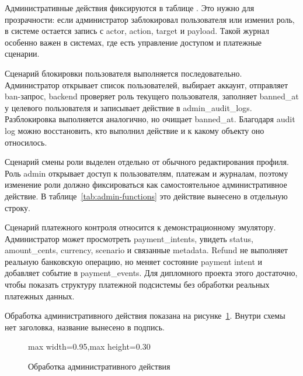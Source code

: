 Административные действия фиксируются в таблице . Это нужно для прозрачности: если администратор заблокировал пользователя или изменил роль, в системе остается запись с actor, action, target и payload. Такой журнал особенно важен в системах, где есть управление доступом и платежные сценарии.




Сценарий блокировки пользователя выполняется последовательно. Администратор открывает список пользователей, выбирает аккаунт, отправляет ban-запрос, backend проверяет роль текущего пользователя, заполняет banned_at у целевого пользователя и записывает действие в admin_audit_logs. Разблокировка выполняется аналогично, но очищает banned_at. Благодаря audit log можно восстановить, кто выполнил действие и к какому объекту оно относилось.

Сценарий смены роли выделен отдельно от обычного редактирования профиля. Роль admin открывает доступ к пользователям, платежам и журналам, поэтому изменение роли должно фиксироваться как самостоятельное административное действие. В таблице~\ref{tab:admin-functions} это действие вынесено в отдельную строку.

Сценарий платежного контроля относится к демонстрационному эмулятору. Администратор может просмотреть payment_intents, увидеть status, amount_cents, currency, scenario и связанные metadata. Refund не выполняет реальную банковскую операцию, но меняет состояние payment intent и добавляет событие в payment_events. Для дипломного проекта этого достаточно, чтобы показать структуру платежной подсистемы без обработки реальных платежных данных.

Обработка административного действия показана на рисунке~\ref{fig:admin-flow}. Внутри схемы нет заголовка, название вынесено в подпись.

\begin{figure}[H]
\centering
\begin{adjustbox}{max width=0.95\textwidth,max height=0.30\textheight}
\end{adjustbox}
\caption{Обработка административного действия}\label{fig:admin-flow}
\end{figure}



